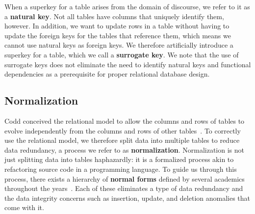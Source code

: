 When a superkey for a table arises from the domain of discourse, we refer to it as a \textbf{natural key}.
Not all tables have columns that uniquely identify them, however.
In addition, we want to update rows in a table without having to update the foreign keys for the tables that reference them, which means we cannot use natural keys as foreign keys.
We therefore artificially introduce a superkey for a table, which we call a \textbf{surrogate key}.
We note that the use of surrogate keys does not eliminate the need to identify natural keys and functional dependencies as a prerequisite for proper relational database design.

\subsection{Normalization}%

Codd conceived the relational model to allow the columns and rows of tables to evolve independently from the columns and rows of other tables~\citep{DBLP:journals/cacm/Codd70}.
To correctly use the relational model, we therefore split data into multiple tables to reduce data redundancy, a process we refer to as \textbf{normalization}.
Normalization is not just splitting data into tables haphazardly\thinspace: it is a formalized process akin to refactoring source code in a programming language.
To guide us through this process, there exists a hierarchy of \textbf{normal forms} defined by several academics throughout the years~\citep{DBLP:journals/cacm/Kent83}.
Each of these eliminates a type of data redundancy and the data integrity concerns such as insertion, update, and deletion anomalies that come with it.


